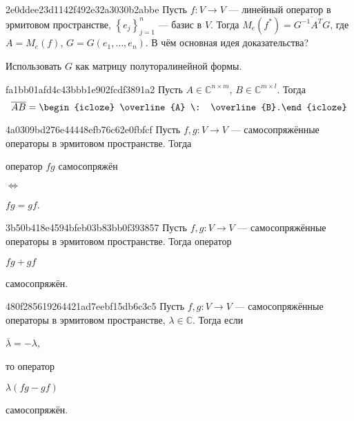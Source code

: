 \begin{note}{2e0ddee23d1142f492e32a3030b2abbe}
    Пусть \({ f : V \to V }\) --- линейный оператор в эрмитовом пространстве,\: \({ \left\{ e_j \right\}_{j = 1}^{n} }\) --- базис в \({ V }\).
    Тогда \({ M_e(f^*) = \overline{G^{-1}A^{T}G} }\), где \({ A = M_e(f) }\),\: \({ G = G(e_1, \ldots, e_n) }\).
    В чём основная идея доказательства?

    \begin{cloze}{1}
        Использовать \({ G }\) как матрицу полуторалинейной формы.
    \end{cloze}
\end{note}

\begin{note}{fa1bb01afd4c43bbb1e902fcdf3891a2}
    Пусть \({ A \in \mathbb C^{n \times m} }\),\: \({ B \in \mathbb C^{m \times l} }\).
    Тогда
    \[
        \overline{AB} = \begin{icloze}{1}\overline{A} \: \overline{B}.\end{icloze}
    \]
\end{note}

\begin{note}{4a0309bd276e44448efb76c62e0fbfcf}
    Пусть \({ f, g : V \to V }\) --- самосопряжённые операторы в эрмитовом пространстве.
    Тогда \begin{icloze}{2}оператор \({ fg }\) самосопряжён\end{icloze} \begin{icloze}{3}\({ \iff }\)\end{icloze} \begin{icloze}{1}\({ fg = gf }\).\end{icloze}
\end{note}

\begin{note}{3b50b418e4594bfeb03b83bb0f393857}
    Пусть \({ f, g : V \to V }\) --- самосопряжённые операторы в эрмитовом пространстве.
    Тогда оператор \begin{icloze}{2}\({ fg + gf }\)\end{icloze} \begin{icloze}{1}самосопряжён.\end{icloze}
\end{note}

\begin{note}{480f285619264421ad7eebf15db6c3c5}
    Пусть \({ f, g : V \to V }\) --- самосопряжённые операторы в эрмитовом пространстве,\: \({ \lambda \in \mathbb C }\).
    Тогда если \begin{icloze}{2}\({ \overline{\lambda} = -\lambda }\),\end{icloze} то оператор \begin{icloze}{3}\({ \lambda(fg - gf) }\)\end{icloze} \begin{icloze}{1}самосопряжён.\end{icloze}
\end{note}

